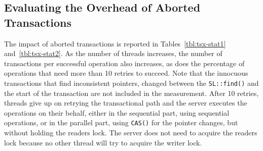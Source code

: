 \subsection{Evaluating the Overhead of Aborted Transactions}
\label{Sec-Eval-Aborted}

The impact of aborted transactions is reported in Tables~\ref{tbl:tsx-stat1} and~\ref{tbl:tsx-stat2}. As the number of threads increases, the number of transactions per successful operation 
also increases, as does the percentage of operations that need more than 10 retries to succeed. 
Note that the innocuous transactions that find inconsistent pointers, changed between the \texttt{SL::find()} and the start of the transaction are not included in the measurement. 
After 10 retries, threads give up on retrying the transactional path and the server executes the operations on their behalf, either in the sequential part, using sequential operations, or in the parallel part, using \texttt{CAS()} for the pointer changes,  but without holding the readers lock. The server does not need to acquire the readers lock because no other thread will try to acquire the writer lock. 


